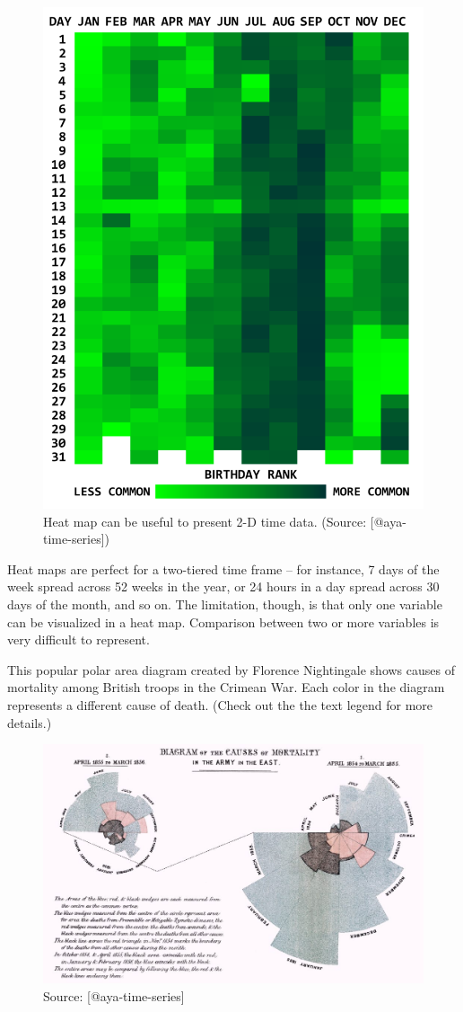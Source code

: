 \documentclass[]{book}
\theoremstyle{definition}
\theoremstyle{definition}
\theoremstyle{definition}
\theoremstyle{remark}
\begin{document}
\begin{figure}

{\centering \includegraphics[width=0.4\linewidth]{images/aya-heat-map} 

}

\caption{Heat map can be useful to present 2-D time data. (Source: [@aya-time-series])}\label{fig:aya-heat-map}
\end{figure}

Heat maps are perfect for a two-tiered time frame -- for instance, 7
days of the week spread across 52 weeks in the year, or 24 hours in a
day spread across 30 days of the month, and so on. The limitation,
though, is that only one variable can be visualized in a heat map.
Comparison between two or more variables is very difficult to represent.

This popular polar area diagram created by Florence Nightingale shows
causes of mortality among British troops in the Crimean War. Each color
in the diagram represents a different cause of death. (Check out the the
text legend for more details.)

\begin{figure}

{\centering \includegraphics[width=0.5\linewidth]{images/aya-polar} 

}

\caption{Source: [@aya-time-series]}\label{fig:aya-polar}
\end{figure}
\end{document}
